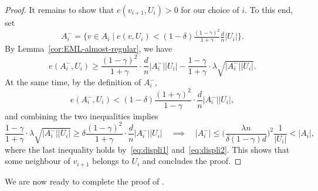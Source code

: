 \documentclass[reqno,a4paper]{amsart}
\theoremstyle{definition}
\begin{document}
\begin{proof}
It remains to show that $e(v_{i+1},U_i)>0$ for our choice of $i$. To this end, set 
\[A_i^- = \big\{v \in A_i \mid e(v,U_i) < (1-\delta)\tfrac{(1-\gamma)^2}{1+\gamma}\tfrac{d}{n}|U_i|\big\}.\]
By Lemma~\ref{cor:EML-almost-regular}, we have
\[
    e(A_i^-,U_i)
    \ge 
    \frac{(1-\gamma)^2}{1+\gamma}\cdot\frac{d}{n}|A_i^-||U_i|
    -\frac{1-\gamma}{1+\gamma}\cdot \lambda \sqrt{|A_i^-||U_i|}.
\]
At the same time, by the definition of $A_i^-$,
\[
    e(A_i^-,U_i)
    <
    (1-\delta)\frac{(1+\gamma)^2}{1-\gamma}\cdot\frac{d}{n}|A_i^-||U_i|,
\]
and combining the two inequalities implies
\begin{equation*}
\frac{1-\gamma}{1+\gamma}\cdot \lambda \sqrt{|A_i^-||U_i|}
\ge 
\delta \frac{(1-\gamma)^2}{1+\gamma}\cdot\frac{d}{n}|A_i^-||U_i|\quad\implies\quad
|A_i^-|
\le
\bigg(\frac{\lambda n}{\delta (1-\gamma)d}\bigg)^2 \frac{1}{|U_i|} < |A_i|,
\end{equation*}
where the last inequality holds by~\eqref{eq:displi1} and~\eqref{eq:displi2}. This shows that some neighbour of $v_{i+1}$ belongs to $U_i$ and concludes the proof.
\end{proof}

We are now ready to complete the proof of .
\end{document}
